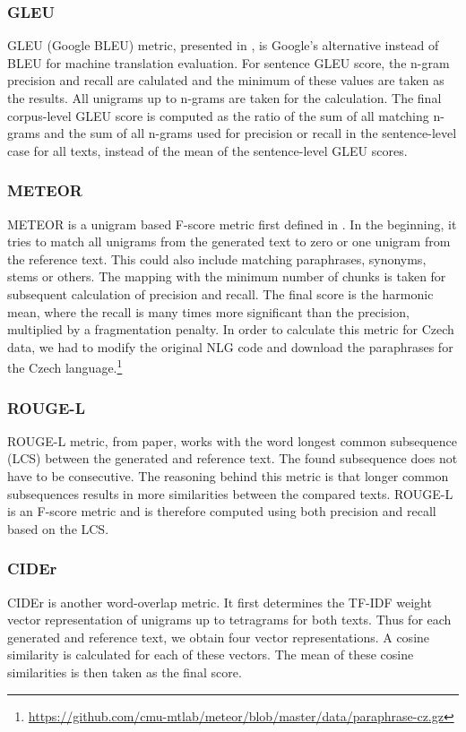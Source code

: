 \subsubsection*{GLEU}
GLEU (Google BLEU) metric, presented in \citet{wu2016google}, is Google's alternative instead of BLEU for machine translation evaluation. For sentence GLEU score, the n-gram precision and recall are calulated and the minimum of these values are taken as the results. All unigrams up to n-grams are taken for the calculation. The final corpus-level GLEU score is computed as the ratio of the sum of all matching n-grams and the sum of all n-grams used for precision or recall in the sentence-level case for all texts, instead of the mean of the sentence-level GLEU scores.

\subsubsection*{METEOR}
METEOR is a unigram based F-score metric first defined in \citet{banerjee2005meteor}. In the beginning, it tries to match all unigrams from the generated text to zero or one unigram from the reference text. This could also include matching paraphrases, synonyms, stems or others. The mapping with the minimum number of chunks is taken for subsequent calculation of precision and recall. The final score is the harmonic mean, where the recall is many times more significant than the precision, multiplied by a fragmentation penalty. In order to calculate this metric for Czech data, we had to modify the original NLG code and download the paraphrases for the Czech language.\footnote[1]{\url{https://github.com/cmu-mtlab/meteor/blob/master/data/paraphrase-cz.gz}}

\subsubsection*{ROUGE-L}
ROUGE-L metric, from \citet{lin2004rouge} paper, works with the word longest common subsequence (LCS) between the generated and reference text. The found subsequence does not have to be consecutive. The reasoning behind this metric is that longer common subsequences results in more similarities between the compared texts. ROUGE-L is an F-score metric and is therefore computed using both precision and recall based on the LCS.

\subsubsection*{CIDEr}
CIDEr\citep{vedantam2015cider} is another word-overlap metric. It first determines the TF-IDF weight vector representation of unigrams up to tetragrams for both texts. Thus for each generated and reference text, we obtain four vector representations. A cosine similarity is calculated for each of these vectors. The mean of these cosine similarities is then taken as the final score.


